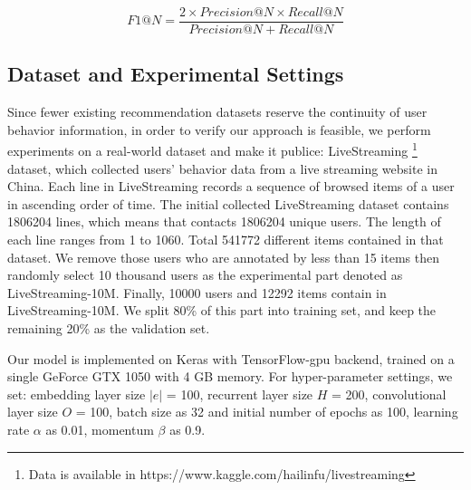 \documentclass[runningheads]{llncs}
\begin{document}
\begin{equation}
F1@N=\frac{2\times Precision@N\times Recall@N}{Precision@N+Recall@N}
\end{equation}
\subsection{Dataset and Experimental Settings}

Since fewer existing recommendation datasets reserve the continuity of user behavior information, in order to verify our approach is feasible, we perform experiments on a real-world dataset and make it publice: LiveStreaming \footnote{Data is available in https://www.kaggle.com/hailinfu/livestreaming} dataset, which collected users' behavior data from a live streaming website in China. Each line in LiveStreaming records a sequence of browsed items of a user in ascending order of time.  The initial collected LiveStreaming dataset contains 1806204 lines, which means that contacts 1806204 unique users. The length of each line ranges from 1 to 1060. Total 541772 different items contained in that dataset. We remove those users who are annotated by less than 15 items then randomly select 10 thousand users as the experimental part denoted as LiveStreaming-10M. Finally, 10000 users and 12292 items contain in LiveStreaming-10M. We split 80\% of this part into training set, and keep the remaining 20\% as the validation set.

Our model is implemented on Keras with TensorFlow-gpu backend, trained on a single GeForce GTX 1050 with 4 GB memory. For hyper-parameter settings, we set: embedding layer size $|e|$ = 100, recurrent layer size $H$ = 200, convolutional layer size $O$ = 100, batch size as 32 and initial number of epochs as 100, learning rate $\alpha$ as 0.01, momentum $\beta $ as 0.9.
\end{document}
